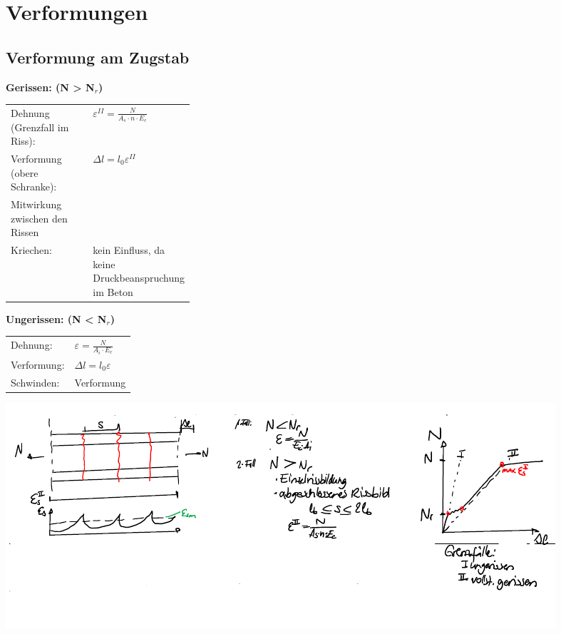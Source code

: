 



	\begin{minipage}{0.5\linewidth}
		
		\section{Verformungen}

		\subsection{Verformung am Zugstab}
		
			
	\textbf{Gerissen: (N > N$_r$) }
	
	\begin{tabular}{lp{0.3\linewidth}}
		
		Dehnung (Grenzfall im Riss):		& $ \varepsilon^{II} =  \frac{N}{A_s \cdot n \cdot E_c} $ \\
		
		Verformung (obere Schranke):		& $ \Delta l = l_0 \varepsilon^{II} $ \\
		
		Mitwirkung zwischen den Rissen	& \\
		
		Kriechen:						& kein Einfluss, da keine Druckbeanspruchung im Beton \\
		
	\end{tabular}
	
\end{minipage}
\begin{minipage}{0.5\linewidth}
		
		
		\textbf{Ungerissen: (N < N$_r$) }
		
		\begin{tabular}{ll}
			Dehnung:		& $ \varepsilon = \frac{N}{A_i \cdot E_c} $ \\
			
			Verformung:		& $ \Delta l = l_0 \varepsilon $ \\
			
			Schwinden:		& Verformung \\
			
		\end{tabular}
				\includegraphics[width=\linewidth]{images/Verformung1Zustand.PNG}
	\end{minipage}


